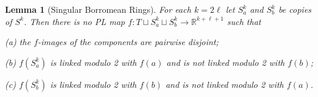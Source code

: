 \documentclass[runningheads]{llncs}
\newtheorem{lemma}[theorem]{Lemma}
\theoremstyle{remark}
\theoremstyle{definition}
\newcommand{\R}{\mathbb{R}}
\newcommand{\Z}{\mathbb{Z}}
\DeclareMathOperator{\lk}{link}
\begin{document}
\begin{lemma}[Singular Borromean Rings]\label{l:bor}
  For each $k=2\ell$ let $S^k_a$ and $S^k_b$ be copies of $S^k$.
  Then there is no PL map $f\colon T\sqcup S^k_a\sqcup S^k_b\to \R^{k+\ell+1}$
  such that

  (a) the $f$-images of the components are pairwise disjoint;

  (b) $f(S^k_a)$ is linked modulo 2 with $f(a)$ and is not linked modulo 2 with $f(b)$;

  (c) $f(S^k_b)$ is linked modulo 2 with $f(b)$ and is not linked modulo 2 with $f(a)$.
\end{lemma}

\end{document}
